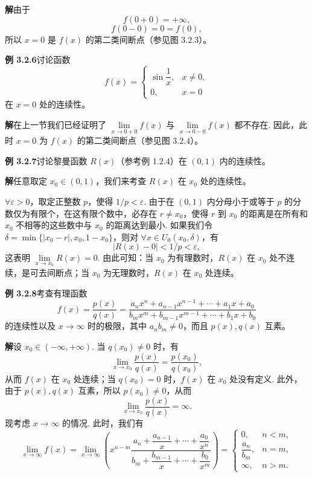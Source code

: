 \documentclass[UTF8,12pt,a4paper,fontset=fandol]{ctexart}
\begin{document}
\noindent\textbf{解}\quad 由于
\[
  f(0+0)=+\infty,
\]
\[
  f(0-0)=0=f(0),
\]
所以 $x=0$ 是 $f(x)$ 的第二类间断点（参见图 3.2.3）。

\noindent\textbf{例 3.2.6}\quad 讨论函数
\[
  f(x)=
  \begin{cases}
    \sin\dfrac1x, & x\ne0,\\
    0, & x=0
  \end{cases}
\]
在 $x=0$ 处的连续性。

\noindent\textbf{解}\quad 在上一节我们已经证明了 $\lim\limits_{x\to0+0}f(x)$ 与 $\lim\limits_{x\to0-0}f(x)$ 都不存在. 因此，此时 $x=0$ 为 $f(x)$ 的第二类间断点（参见图 3.2.4）。

\noindent\textbf{例 3.2.7}\quad 讨论黎曼函数 $R(x)$（参考例 1.2.4）在 $(0,1)$ 内的连续性。

\noindent\textbf{解}\quad 任意取定 $x_0\in(0,1)$，我们来考查 $R(x)$ 在 $x_0$ 处的连续性。

$\forall\varepsilon>0$，取定正整数 $p$，使得 $1/p<\varepsilon$. 由于在 $(0,1)$ 内分母小于或等于 $p$ 的分数仅为有限个，在这有限个数中，必存在 $r\ne x_0$，使得 $r$ 到 $x_0$ 的距离是在所有和 $x_0$ 不相等的这些数中与 $x_0$ 的距离达到最小. 如果我们令 $\delta=\min\{|x_0-r|,x_0,1-x_0\}$，则对 $\forall x\in U_0(x_0,\delta)$，有
\[
  |R(x)-0|<1/p<\varepsilon,
\]
这表明 $\lim\limits_{x\to x_0}R(x)=0$. 由此可知：当 $x_0$ 为有理数时，$R(x)$ 在 $x_0$ 处不连续，是可去间断点；当 $x_0$ 为无理数时，$R(x)$ 在 $x_0$ 处连续。

\noindent\textbf{例 3.2.8}\quad 考查有理函数
\[
  f(x)=\frac{p(x)}{q(x)}
  =
  \frac{a_nx^n+a_{n-1}x^{n-1}+\cdots+a_1x+a_0}
       {b_mx^m+b_{m-1}x^{m-1}+\cdots+b_1x+b_0}
\]
的连续性以及 $x\to\infty$ 时的极限，其中 $a_nb_m\ne0$，而且 $p(x),q(x)$ 互素。

\noindent\textbf{解}\quad 设 $x_0\in(-\infty,+\infty)$. 当 $q(x_0)\ne0$ 时，有
\[
  \lim_{x\to x_0}\frac{p(x)}{q(x)}=\frac{p(x_0)}{q(x_0)},
\]
从而 $f(x)$ 在 $x_0$ 处连续；当 $q(x_0)=0$ 时，$f(x)$ 在 $x_0$ 处没有定义. 此外，由于 $p(x),q(x)$ 互素，所以 $p(x_0)\ne0$，从而
\[
  \lim_{x\to x_0}\frac{p(x)}{q(x)}=\infty.
\]
现考虑 $x\to\infty$ 的情况. 此时，我们有
\[
  \lim_{x\to\infty}f(x)
  =
  \lim_{x\to\infty}
  \left(
    x^{n-m}\frac{a_n+\dfrac{a_{n-1}}x+\cdots+\dfrac{a_0}{x^n}}
    {b_m+\dfrac{b_{m-1}}x+\cdots+\dfrac{b_0}{x^m}}
  \right)
  =
  \begin{cases}
    0, & n<m,\\[4pt]
    \dfrac{a_n}{b_m}, & n=m,\\[6pt]
    \infty, & n>m.
  \end{cases}
\]
\end{document}
